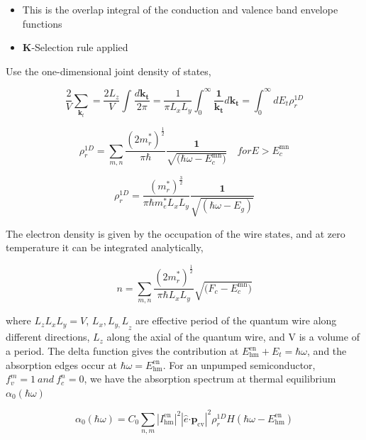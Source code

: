 \begin{itemize}
\item
  This is the overlap integral of the conduction and valence band
  envelope functions
\item
  \textbf{K}-Selection rule applied
\end{itemize}

Use the one-dimensional joint density of states,

\begin{equation}
\frac{2}{V}\sum_{\bm{k}_{t}}^{}{= \frac{2L_{z}}{V}}\int_{}^{}\frac{d\bm{k}_{\bm{t}}}{2\pi} = \frac{1}{\pi L_{x}L_{y}}\int_{0}^{\infty}\frac{\bm{1}}{\bm{k}_{\bm{t}}}d\bm{k}_{\bm{t}}\bm{=}\int_{0}^{\infty}{dE_{t}}\rho_{r}^{1D}
\end{equation}

\begin{equation}
\rho_{r}^{1D} = \sum_{m,n}^{}{\frac{\left( {2m}_{r}^{*} \right)^{\frac{1}{2}}}{\pi\hbar}\frac{\bm{1}}{\sqrt{\bm{(}\hbar\omega - E_{c}^{\text{mn}}\bm{)}}}} \quad
for {E > E}_{c}^{\text{mn}}
\end{equation}

\begin{equation}
  \rho_{r}^{1D} = \frac{\left( m_{r}^{*} \right)^{\frac{3}{2}}}{\pi{\hbar}m_{e}^{*}L_{x}L_{y}}\frac{\bm{1}}{\sqrt{(\hbar\omega - E_{g})}}
\end{equation}

The electron density is given by the occupation of the wire states, and
at zero temperature it can be integrated analytically,

\begin{equation}
n = \sum_{m,n}^{}{\frac{\left( {2m}_{r}^{*} \right)^{\frac{1}{2}}}{\pi{\hbar}L_{x}L_{y}}}\sqrt{\bm{(}F_{c} - E_{c}^{\text{mn}}\bm{)}}
\end{equation}

where \(L_{z}L_{x}L_{y} = V\), \({L_{x},L_{y,}L}_{z}\) are effective
period of the quantum wire along different directions, \(L_{z}\) along
the axial of the quantum wire, and V is a volume of a period. The delta
function gives the contribution at
\(E_{\text{hm}}^{\text{en}} + E_{t} = \hbar\omega\), and the
absorption edges occur at \(\hbar\omega = E_{\text{hm}}^{\text{en}}\).
For an unpumped semiconductor, \(f_{v}^{m} = 1\ and\ f_{c}^{n} = 0\), we
have the absorption spectrum at thermal equilibrium
\(\alpha_{0}\left( \hbar\omega \right)\)

\begin{equation}
\alpha_{0}\left( \hbar\omega \right) = C_{0}\sum_{n,m}^{}\left| I_{\text{hm}}^{\text{en}} \right|^{2}\left| \hat{e}\bm{\cdot}\bm{p}_{\text{cv}} \right|^{2}\rho_{r}^{1D}H(\hbar\omega - E_{\text{hm}}^{\text{en}})
\end{equation}

